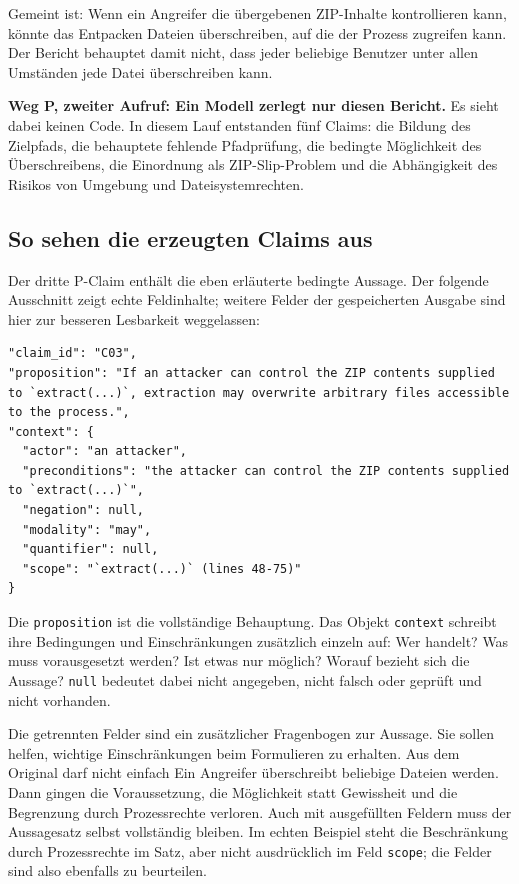 \documentclass[10pt,a4paper]{article}
\begin{document}
Gemeint ist: Wenn ein Angreifer die übergebenen ZIP-Inhalte kontrollieren kann, könnte das Entpacken Dateien überschreiben, auf die der Prozess zugreifen kann. Der Bericht behauptet damit nicht, dass jeder beliebige Benutzer unter allen Umständen jede Datei überschreiben kann.

\textbf{Weg P, zweiter Aufruf: Ein Modell zerlegt nur diesen Bericht.} Es sieht dabei keinen Code. In diesem Lauf entstanden fünf Claims: die Bildung des Zielpfads, die behauptete fehlende Pfadprüfung, die bedingte Möglichkeit des Überschreibens, die Einordnung als ZIP-Slip-Problem und die Abhängigkeit des Risikos von Umgebung und Dateisystemrechten.

\newpage
\subsection{So sehen die erzeugten Claims aus}
Der dritte P-Claim enthält die eben erläuterte bedingte Aussage. Der folgende Ausschnitt zeigt echte Feldinhalte; weitere Felder der gespeicherten Ausgabe sind hier zur besseren Lesbarkeit weggelassen:

\begin{lstlisting}
"claim_id": "C03",
"proposition": "If an attacker can control the ZIP contents supplied to `extract(...)`, extraction may overwrite arbitrary files accessible to the process.",
"context": {
  "actor": "an attacker",
  "preconditions": "the attacker can control the ZIP contents supplied to `extract(...)`",
  "negation": null,
  "modality": "may",
  "quantifier": null,
  "scope": "`extract(...)` (lines 48-75)"
}
\end{lstlisting}

Die \texttt{proposition} ist die vollständige Behauptung. Das Objekt \texttt{context} schreibt ihre Bedingungen und Einschränkungen zusätzlich einzeln auf: Wer handelt? Was muss vorausgesetzt werden? Ist etwas nur möglich? Worauf bezieht sich die Aussage? \texttt{null} bedeutet dabei \glqq{}nicht angegeben\grqq{}, nicht \glqq{}falsch\grqq{} oder \glqq{}geprüft und nicht vorhanden\grqq{}.

Die getrennten Felder sind ein zusätzlicher Fragenbogen zur Aussage. Sie sollen helfen, wichtige Einschränkungen beim Formulieren zu erhalten. Aus dem Original darf nicht einfach \glqq{}Ein Angreifer überschreibt beliebige Dateien\grqq{} werden. Dann gingen die Voraussetzung, die Möglichkeit statt Gewissheit und die Begrenzung durch Prozessrechte verloren. Auch mit ausgefüllten Feldern muss der Aussagesatz selbst vollständig bleiben. Im echten Beispiel steht die Beschränkung durch Prozessrechte im Satz, aber nicht ausdrücklich im Feld \texttt{scope}; die Felder sind also ebenfalls zu beurteilen.
\end{document}
